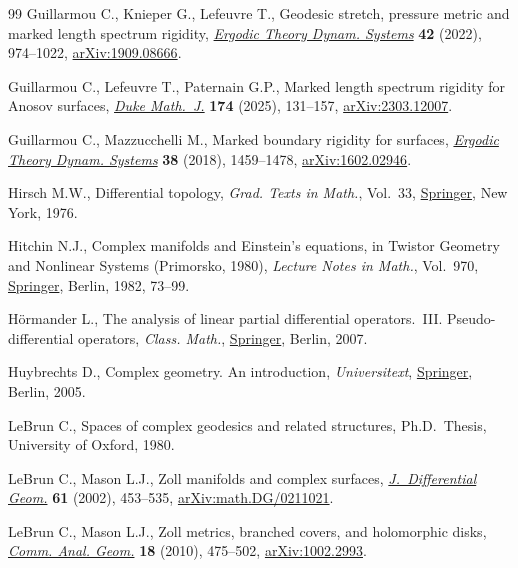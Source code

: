 \documentclass[10pt,a4paper]{amsart}
\numberwithin{equation}{section}
\theoremstyle{definition}
\newcommand{\1}{{\bf 1}}
\begin{document}
\begin{thebibliography}{99}
Guillarmou C., Knieper G., Lefeuvre T., Geodesic stretch, pressure metric and
 marked length spectrum rigidity,
 \href{https://doi.org/10.1017/etds.2021.75}{\textit{Ergodic Theory Dynam.
 Systems}} \textbf{42} (2022), 974--1022,
 \href{http://arxiv.org/abs/1909.08666}{arXiv:1909.08666}.

Guillarmou C., Lefeuvre T., Paternain G.P., Marked length spectrum rigidity for
 {A}nosov surfaces,
 \href{https://doi.org/10.1215/00127094-2024-0022}{\textit{Duke Math.~J.}}
 \textbf{174} (2025), 131--157,
 \href{http://arxiv.org/abs/2303.12007}{arXiv:2303.12007}.

Guillarmou C., Mazzucchelli M., Marked boundary rigidity for surfaces,
 \href{https://doi.org/10.1017/etds.2016.94}{\textit{Ergodic Theory Dynam.
 Systems}} \textbf{38} (2018), 1459--1478,
 \href{http://arxiv.org/abs/1602.02946}{arXiv:1602.02946}.

Hirsch M.W., Differential topology, \textit{Grad. Texts in Math.}, Vol.~33,
 \href{https://doi.org/10.1007/978-1-4684-9449-5}{Springer}, New York, 1976.

Hitchin N.J., Complex manifolds and {E}instein's equations, in Twistor
 {G}eometry and {N}onlinear {S}ystems ({P}rimorsko, 1980), \textit{Lecture
 Notes in Math.}, Vol.~970,
 \href{https://doi.org/10.1007/BFb0066025}{Springer}, Berlin, 1982, 73--99.

H\"ormander L., The analysis of linear partial differential operators.~{III}.
 Pseudo-differential operators, \textit{Class. Math.},
 \href{https://doi.org/10.1007/978-3-540-49938-1}{Springer}, Berlin, 2007.

Huybrechts D., Complex geometry. An introduction, \textit{Universitext},
 \href{https://doi.org/10.1007/b137952}{Springer}, Berlin, 2005.

LeBrun C., Spaces of complex geodesics and related structures, Ph.D.~Thesis,
 {U}niversity of Oxford, 1980.

LeBrun C., Mason L.J., Zoll manifolds and complex surfaces,
 \href{https://doi.org/10.4310/jdg/1090351530}{\textit{J.~Differential Geom.}}
 \textbf{61} (2002), 453--535,
 \href{http://arxiv.org/abs/math.DG/0211021}{arXiv:math.DG/0211021}.

LeBrun C., Mason L.J., Zoll metrics, branched covers, and holomorphic disks,
 \href{https://doi.org/10.4310/CAG.2010.v18.n3.a3}{\textit{Comm. Anal. Geom.}}
 \textbf{18} (2010), 475--502,
 \href{http://arxiv.org/abs/1002.2993}{arXiv:1002.2993}.


\end{thebibliography}
\end{document}
